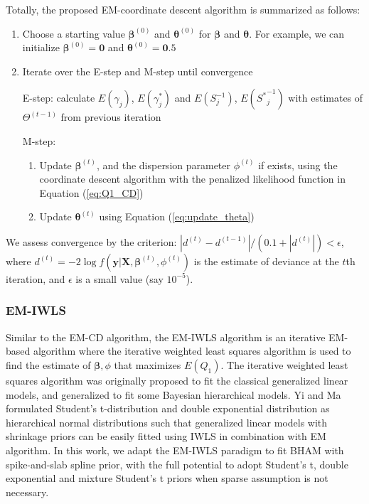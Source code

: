 \documentclass[AMA,STIX1COL,]{WileyNJD-v2}
\begin{document}
Totally, the proposed EM-coordinate descent algorithm is summarized as
follows:

\begin{enumerate}
\def\labelenumi{\arabic{enumi})}
\item
  Choose a starting value \(\boldsymbol{\beta}^{(0)}\) and
  \(\boldsymbol{\theta}^{(0)}\) for \(\boldsymbol{\beta}\) and
  \(\boldsymbol{\theta}\). For example, we can initialize
  \(\boldsymbol{\beta}^{(0)} = \boldsymbol{0}\) and
  \(\boldsymbol{\theta}^{(0)} = \boldsymbol{0}.5\)
\item
  Iterate over the E-step and M-step until convergence

  E-step: calculate \(E(\gamma_{j})\), \(E(\gamma^*_{j})\) and
  \(E({S}^{-1}_{j})\), \(E({S^*}^{-1}_{j})\) with estimates of
  \(\Theta^{(t-1)}\) from previous iteration

  M-step:

  \begin{enumerate}
  \def\labelenumii{\alph{enumii})}
  \item
    Update \(\boldsymbol{\beta}^{(t)}\), and the dispersion parameter
    \(\phi^{(t)}\) if exists, using the coordinate descent algorithm
    with the penalized likelihood function in Equation (\ref{eq:Q1_CD})
  \item
    Update \(\boldsymbol{\theta}^{(t)}\) using Equation
    (\ref{eq:update_theta})
  \end{enumerate}
\end{enumerate}

We assess convergence by the criterion:
\(|d^{(t)}-d^{(t-1)}|/(0.1+|d^{(t)}|)<\epsilon\), where
\(d^{(t)} = -2\log f(\textbf{y}| \textbf{X}, \boldsymbol{\beta}^{(t)},\phi^{(t)})\)
is the estimate of deviance at the \(t\)th iteration, and \(\epsilon\)
is a small value (say \(10^{-5}\)).

\hypertarget{em-iwls}{%
\subsubsection{EM-IWLS}\label{em-iwls}}

Similar to the EM-CD algorithm, the EM-IWLS algorithm is an iterative
EM-based algorithm where the iterative weighted least squares algorithm
is used to find the estimate of \(\boldsymbol{\beta}, \phi\) that
maximizes \(E(Q_1)\). The iterative weighted least squares algorithm was
originally proposed to fit the classical generalized linear models, and
generalized to fit some Bayesian hierarchical models.\citep{Gelman2013}
Yi and Ma \citep{Yi2012} formulated Student's t-distribution and double
exponential distribution as hierarchical normal distributions such that
generalized linear models with shrinkage priors can be easily fitted
using IWLS in combination with EM algorithm. In this work, we adapt the
EM-IWLS paradigm to fit BHAM with spike-and-slab spline prior, with the
full potential to adopt Student's t, double exponential and mixture
Student's t priors when sparse assumption is not necessary.
\end{document}
